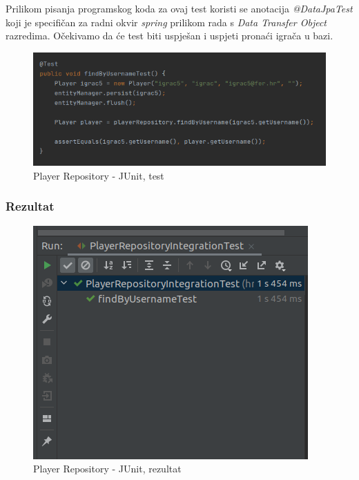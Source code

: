 					{Prilikom pisanja programskog koda za ovaj test koristi se anotacija \textit{@DataJpaTest} koji je specifičan za radni okvir \textit{spring} prilikom rada s \textit{Data Transfer Object} razredima. Očekivamo da će test biti uspješan i uspjeti pronaći igrača u bazi.}
					
						\begin{figure}[H]
							\includegraphics[width=\textwidth]{slike/playerFindByUsernameTest} 
							\centering
							\caption{Player Repository - JUnit, test}
							\label{}
						\end{figure}
					
				\subsubsection{Rezultat}
						
						\begin{figure}[H]
							\includegraphics[width=\textwidth]{slike/playerFindByUsernameTest_result} 
							\centering
							\caption{Player Repository - JUnit, rezultat}
							\label{}
						\end{figure}
					

